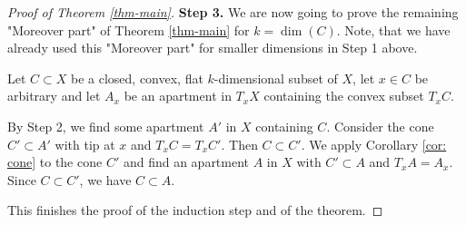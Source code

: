\documentclass[12pt,leqno]{amsart}
\numberwithin{equation}{section}
\theoremstyle{definition}
\theoremstyle{remark}
\begin{document}
\begin{proof}[Proof of Theorem \ref{thm-main}]
{\bf Step 3.}   We are now going to prove the remaining "Moreover part" of Theorem \ref{thm-main} for  $k=\dim (C)$.  Note, that we have already used this "Moreover part"  for smaller dimensions in Step 1 above.

 Let   $C\subset X$ be a closed, convex, flat $k$-dimensional subset of $X$, let $x\in C$ be arbitrary and let $A_x$ be an apartment in $T_xX$ containing the convex subset $T_xC$.   

By Step 2, we find some apartment $A'$ in $X$ containing $C$.  Consider
the cone $C' \subset A'$  with tip at $x$ and  $T_xC =T_xC'$.   Then $C\subset C'$.  We  
 apply  Corollary \ref{cor: cone} to the cone $C'$  and find an apartment $A$ in $X$  with $C'\subset A$ and $T_xA= A_x$.   Since $C\subset C'$, we have $C\subset A$.

This finishes the proof of the induction step and  of the theorem.
\end{proof}



\end{document}
